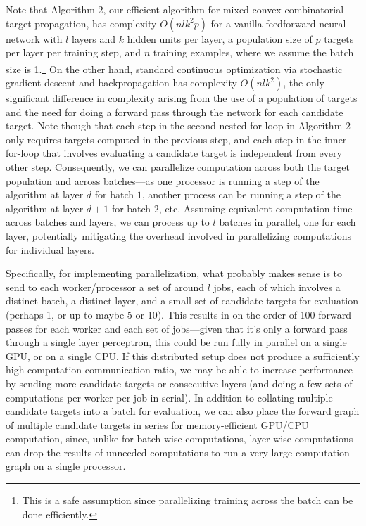 \documentclass[12pt,letterpaper]{article}
\begin{document}
Note that Algorithm 2, our efficient algorithm for mixed convex-combinatorial target propagation, has complexity $O(nlk^{2}p)$ for a vanilla feedforward neural network with $l$ layers and $k$ hidden units per layer, a population size of $p$ targets per layer per training step, and $n$ training examples, where we assume the batch size is 1.\footnote{This is a safe assumption since parallelizing training across the batch can be done efficiently.} On the other hand, standard continuous optimization via stochastic gradient descent and backpropagation has complexity $O(nlk^{2})$, the only significant difference in complexity arising from the use of a population of targets and the need for doing a forward pass through the network for each candidate target. Note though that each step in the second nested for-loop in Algorithm 2 only requires targets computed in the previous step, and each step in the inner for-loop that involves evaluating a candidate target is independent from every other step. Consequently, we can parallelize computation across both the target population and across batches---as one processor is running a step of the algorithm 
at layer $d$ for batch $1$, another process can be running a step of the algorithm at layer $d+1$ for batch $2$, etc. Assuming equivalent computation time across batches and layers, we can process up to $l$ batches in parallel, one for each layer, potentially mitigating the overhead involved in parallelizing computations for individual layers. 

Specifically, for implementing parallelization, what probably makes sense is to send to each worker/processor a set of around $l$ jobs, each of which involves a distinct batch, a distinct layer, and a small set of candidate targets for evaluation (perhaps 1, or up to maybe 5 or 10). This results in on the order of 100 forward passes for each worker and each set of jobs---given that it's only a forward pass through a single layer perceptron, this could be run fully in parallel on a single GPU, or on a single CPU. If this distributed setup does not produce a sufficiently high computation-communication ratio, we may be able to increase performance by sending more candidate targets or consecutive layers (and doing a few sets of computations per worker per job in serial). In addition to collating multiple candidate targets into a batch for evaluation, we can also place the forward graph of multiple candidate targets in series for memory-efficient GPU/CPU computation, since, unlike for batch-wise computations, layer-wise computations can drop the results of unneeded computations to run a very large computation graph on a single processor. 
\end{document}
